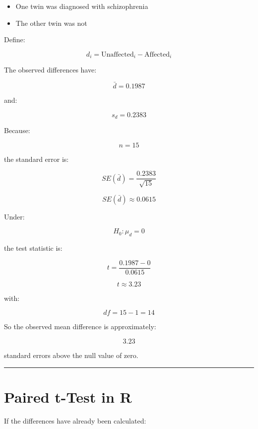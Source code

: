 \documentclass[
  letterpaper,
  DIV=11,
  numbers=noendperiod]{scrreprt}
\newenvironment{Shaded}{\begin{snugshade}}{\end{snugshade}}
\newcommand{\AttributeTok}[1]{\textcolor[rgb]{0.40,0.45,0.13}{#1}}
\newcommand{\DecValTok}[1]{\textcolor[rgb]{0.68,0.00,0.00}{#1}}
\newcommand{\FunctionTok}[1]{\textcolor[rgb]{0.28,0.35,0.67}{#1}}
\newcommand{\NormalTok}[1]{\textcolor[rgb]{0.00,0.23,0.31}{#1}}
\newcommand{\SpecialCharTok}[1]{\textcolor[rgb]{0.37,0.37,0.37}{#1}}
\providecommand{\tightlist}{%
  \setlength{\itemsep}{0pt}\setlength{\parskip}{0pt}}
\begin{document}
\begin{itemize}
\tightlist
\item
  One twin was diagnosed with schizophrenia
\item
  The other twin was not
\end{itemize}

Define:

\[
d_i
=
\text{Unaffected}_i
-
\text{Affected}_i
\]

The observed differences have:

\[
\bar{d}=0.1987
\]

and:

\[
s_d=0.2383
\]

Because:

\[
n=15
\]

the standard error is:

\[
SE(\bar{d})
=
\frac{0.2383}{\sqrt{15}}
\]

\[
SE(\bar{d})
\approx0.0615
\]

Under:

\[
H_0:\mu_d=0
\]

the test statistic is:

\[
t=
\frac{0.1987-0}
{0.0615}
\]

\[
t\approx3.23
\]

with:

\[
df=15-1=14
\]

So the observed mean difference is approximately:

\[
3.23
\]

standard errors above the null value of zero.

\begin{center}\rule{0.5\linewidth}{0.5pt}\end{center}

\section{Paired t-Test in R}\label{paired-t-test-in-r}

If the differences have already been calculated:

\begin{Shaded}
\end{Shaded}
\end{document}
